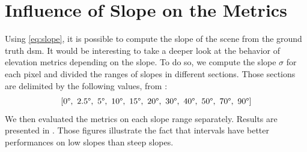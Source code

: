 \section{Influence of Slope on the Metrics}
Using \cref{eq:slope}, it is possible to compute the slope of the scene from the ground truth \acrshort{dsm}. It would be interesting to take a deeper look at the behavior of elevation metrics depending on the slope. To do so, we compute the slope $\sigma$ for each pixel and divided the ranges of slopes in different sections. Those sections are delimited by the following values, from \cite{hugonnet_uncertainty_2022}:
$$
[0\degree, ~2.5\degree, ~5\degree, ~10\degree, ~15\degree, ~20\degree, ~30\degree, ~40\degree, ~50\degree, ~70\degree, ~90\degree]
$$
We then evaluated the metrics on each slope range separately. Results are presented in . Those figures illustrate the fact that intervals have better performances on low slopes than steep slopes.

